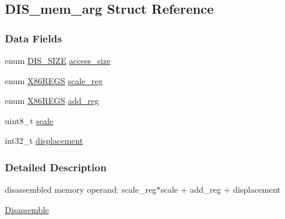 \hypertarget{struct_d_i_s__mem__arg}{
\subsection{DIS\_\-mem\_\-arg Struct Reference}
\label{struct_d_i_s__mem__arg}
}
\subsubsection*{Data Fields}
\begin{DoxyCompactItemize}
\item 
enum \hyperlink{bytecode__disasm_8h_a6a0d419b6b61630b1f76a25ff39df84d}{DIS\_\-SIZE} \hyperlink{struct_d_i_s__mem__arg_abe85ed51a3596cdb3a868a284c3d961f}{access\_\-size}
\item 
enum \hyperlink{bytecode__disasm_8h_a87af2e927a80478796188d9d8d813d82}{X86REGS} \hyperlink{struct_d_i_s__mem__arg_afb3d2d6aee6f877fd62b8ffc576d9351}{scale\_\-reg}
\item 
enum \hyperlink{bytecode__disasm_8h_a87af2e927a80478796188d9d8d813d82}{X86REGS} \hyperlink{struct_d_i_s__mem__arg_abdbd08c3d265ff494ad5ff1006cc6a73}{add\_\-reg}
\item 
uint8\_\-t \hyperlink{struct_d_i_s__mem__arg_a616c0a72f0e4af38b93c736773ac7210}{scale}
\item 
int32\_\-t \hyperlink{struct_d_i_s__mem__arg_a241d2c58aca95f8589148d4acf97406d}{displacement}
\end{DoxyCompactItemize}


\subsubsection{Detailed Description}
disassembled memory operand: scale\_\-reg$\ast$scale + add\_\-reg + displacement \begin{Desc}
\item[\hyperlink{disasm__disasm000002}{Disassemble}]\end{Desc}



